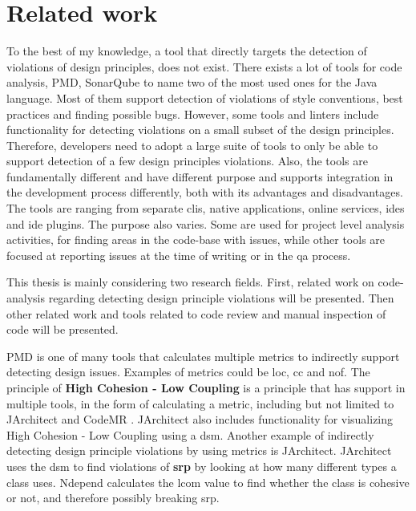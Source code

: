 \documentclass[pdftex,10pt,b5paper,twoside]{report}
\begin{document}
\chapter{Related work}
\label{relatedwork}

To the best of my knowledge, a tool that directly targets the detection of violations of design principles, does not exist. There exists a lot of tools for code analysis, PMD\cite{pmd}, SonarQube\cite{sonarqube} to name two of the most used ones for the Java language. Most of them support detection of violations of style conventions, best practices and finding possible bugs. However, some tools and linters include functionality for detecting violations on a small subset of the design principles. Therefore, developers need to adopt a large suite of tools to only be able to support detection of a few design principles violations. Also, the tools are fundamentally different and have different purpose and supports integration in the development process differently, both with its advantages and disadvantages. The tools are ranging from separate \gls{cli}s, native applications, online services, \gls{ide}s and \gls{ide} plugins. The purpose also varies. Some are used for project level analysis activities, for finding areas in the code-base with issues, while other tools are focused at reporting issues at the time of writing or in the \gls{qa} process. 

This thesis is mainly considering two research fields. First, related work on code-analysis regarding detecting design principle violations will be presented. Then other related work and tools related to code review and manual inspection of code will be presented.

PMD \cite{pmd} is one of many tools that calculates multiple metrics to indirectly support detecting design issues. Examples of metrics could be \gls{loc}, \gls{cc} and \gls{nof}. The principle of \textbf{High Cohesion - Low Coupling} is a principle that has support in multiple tools, in the form of calculating a metric, including but not limited to JArchitect \cite{jarchitect} and CodeMR \cite{codemr}. JArchitect \cite{jarchitect} also includes functionality for visualizing High Cohesion - Low Coupling using a \gls{dsm}. Another example of indirectly detecting design principle violations by using metrics is JArchitect. JArchitect uses the \gls{dsm} to find violations of \textbf{\gls{srp}} by looking at how many different types a class uses. Ndepend \cite{ndepend} calculates the \gls{lcom} value to find whether the class is cohesive or not, and therefore possibly breaking \gls{srp}. 
\end{document}
